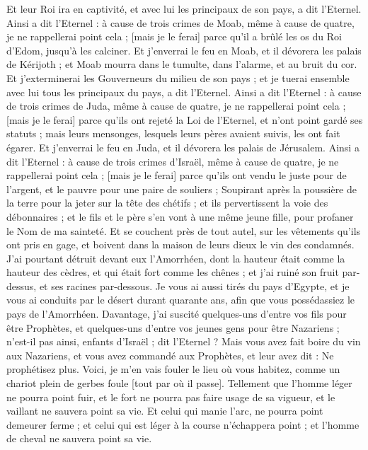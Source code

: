 \begin{multicols}{2}
Et leur Roi ira en captivité, et avec lui les principaux de son pays, a dit l'Eternel.
\VerseOne{}Ainsi a dit l'Eternel : à cause de trois crimes de Moab, même à cause de quatre, je ne rappellerai point cela ; [mais je le ferai] parce qu'il a brûlé les os du Roi d'Edom, jusqu'à les calciner.
Et j'enverrai le feu en Moab, et il dévorera les palais de Kérijoth ; et Moab mourra dans le tumulte, dans l'alarme, et au bruit du cor.
Et j'exterminerai les Gouverneurs du milieu de son pays ; et je tuerai ensemble avec lui tous les principaux du pays, a dit l'Eternel.
Ainsi a dit l'Eternel : à cause de trois crimes de Juda, même à cause de quatre, je ne rappellerai point cela ; [mais je le ferai] parce qu'ils ont rejeté la Loi de l'Eternel, et n'ont point gardé ses statuts ; mais leurs mensonges, lesquels leurs pères avaient suivis, les ont fait égarer.
Et j'enverrai le feu en Juda, et il dévorera les palais de Jérusalem.
Ainsi a dit l'Eternel : à cause de trois crimes d'Israël, même à cause de quatre, je ne rappellerai point cela ; [mais je le ferai] parce qu'ils ont vendu le juste pour de l'argent, et le pauvre pour une paire de souliers ;
Soupirant après la poussière de la terre pour la jeter sur la tête des chétifs ; et ils pervertissent la voie des débonnaires ; et le fils et le père s'en vont à une même jeune fille, pour profaner le Nom de ma sainteté.
Et se couchent près de tout autel, sur les vêtements qu'ils ont pris en gage, et boivent dans la maison de leurs dieux le vin des condamnés.
J'ai pourtant détruit devant eux l'Amorrhéen, dont la hauteur était comme la hauteur des cèdres, et qui était fort comme les chênes ; et j'ai ruiné son fruit par-dessus, et ses racines par-dessous.
Je vous ai aussi tirés du pays d'Egypte, et je vous ai conduits par le désert durant quarante ans, afin que vous possédassiez le pays de l'Amorrhéen.
Davantage, j'ai suscité quelques-uns d'entre vos fils pour être Prophètes, et quelques-uns d'entre vos jeunes gens pour être Nazariens ; n'est-il pas ainsi, enfants d'Israël ; dit l'Eternel ?
Mais vous avez fait boire du vin aux Nazariens, et vous avez commandé aux Prophètes, et leur avez dit : Ne prophétisez plus.
Voici, je m'en vais fouler le lieu où vous habitez, comme un chariot plein de gerbes foule [tout par où il passe].
Tellement que l'homme léger ne pourra point fuir, et le fort ne pourra pas faire usage de sa vigueur, et le vaillant ne sauvera point sa vie.
Et celui qui manie l'arc, ne pourra point demeurer ferme ; et celui qui est léger à la course n'échappera point ; et l'homme de cheval ne sauvera point sa vie.

\end{multicols}
